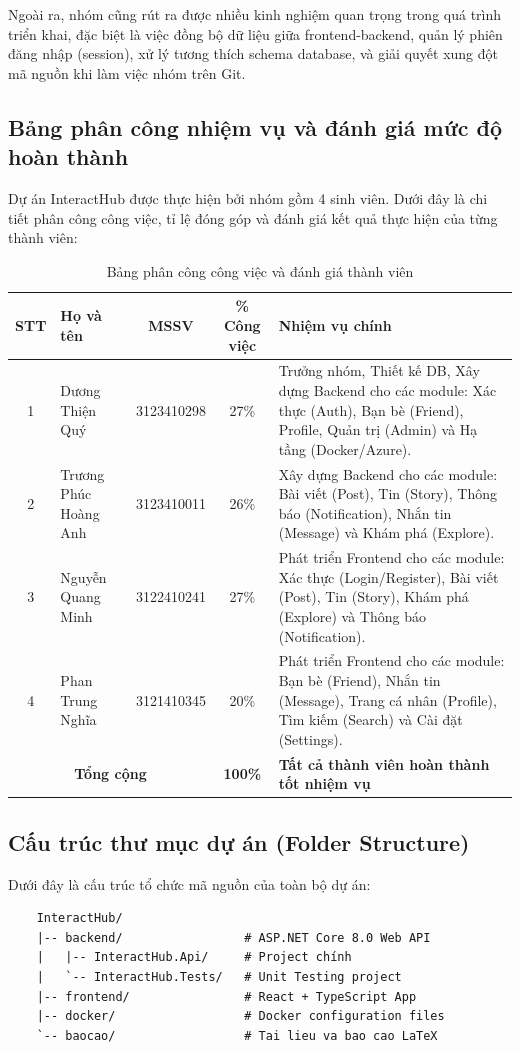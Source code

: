 \documentclass[a4paper]{article}
\begin{document}
    Ngoài ra, nhóm cũng rút ra được nhiều kinh nghiệm quan trọng trong quá trình triển khai, đặc biệt là việc đồng bộ dữ liệu giữa frontend-backend, quản lý phiên đăng nhập (session), xử lý tương thích schema database, và giải quyết xung đột mã nguồn khi làm việc nhóm trên Git.

   \subsection{Bảng phân công nhiệm vụ và đánh giá mức độ hoàn thành}
    Dự án InteractHub được thực hiện bởi nhóm gồm 4 sinh viên. Dưới đây là chi tiết phân công công việc, tỉ lệ đóng góp và đánh giá kết quả thực hiện của từng thành viên:

    \begin{table}[H]
    \centering
    \small
    \renewcommand{\arraystretch}{1.5}
    \begin{tabularx}{\textwidth}{|c|p{3.5cm}|c|c|X|}
    \hline
    \rowcolor{gray!10}
    \textbf{STT} & \textbf{Họ và tên} & \textbf{MSSV} & \textbf{\% Công việc} & \textbf{Nhiệm vụ chính} \\
    \hline
    1 & Dương Thiện Quý & 3123410298 & 27\% & Trưởng nhóm, Thiết kế DB, Xây dựng Backend cho các module: Xác thực (Auth), Bạn bè (Friend), Profile, Quản trị (Admin) và Hạ tầng (Docker/Azure). \\
    \hline
    2 & Trương Phúc Hoàng Anh & 3123410011 & 26\% & Xây dựng Backend cho các module: Bài viết (Post), Tin (Story), Thông báo (Notification), Nhắn tin (Message) và Khám phá (Explore). \\
    \hline
    3 & Nguyễn Quang Minh & 3122410241 & 27\% & Phát triển Frontend cho các module: Xác thực (Login/Register), Bài viết (Post), Tin (Story), Khám phá (Explore) và Thông báo (Notification). \\
    \hline
    4 & Phan Trung Nghĩa & 3121410345 & 20\% & Phát triển Frontend cho các module: Bạn bè (Friend), Nhắn tin (Message), Trang cá nhân (Profile), Tìm kiếm (Search) và Cài đặt (Settings). \\
    \hline
    \multicolumn{3}{|c|}{\textbf{Tổng cộng}} & \textbf{100\%} & \textbf{Tất cả thành viên hoàn thành tốt nhiệm vụ}\\
    \hline
    \end{tabularx}
    \caption{Bảng phân công công việc và đánh giá thành viên}
    \label{table:task_assignment}
    \end{table}

    \subsection{Cấu trúc thư mục dự án (Folder Structure)}
    Dưới đây là cấu trúc tổ chức mã nguồn của toàn bộ dự án:
    \begin{verbatim}
    InteractHub/
    |-- backend/                 # ASP.NET Core 8.0 Web API
    |   |-- InteractHub.Api/     # Project chính
    |   `-- InteractHub.Tests/   # Unit Testing project
    |-- frontend/                # React + TypeScript App
    |-- docker/                  # Docker configuration files
    `-- baocao/                  # Tai lieu va bao cao LaTeX
    \end{verbatim}
\end{document}
